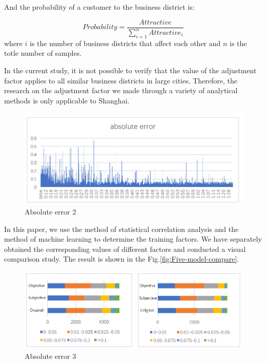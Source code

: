 \documentclass[journal,transmag]{IEEEtran}
\begin{document}
And the probability of a customer to the business district is:

\begin{equation}
Probability=\frac{Attractive}{\sum_{i=1}^{n}Attractive_{i}}
\end{equation}
where $i$ is the number of business districts that affect each other and $n$ is the totle number of samples.

In the current study, it is not possible to verify that the value of the adjustment factor applies to all similar business districts in large cities. Therefore, the research on the adjustment factor we made through a variety of analytical methods is only applicable to Shanghai.

\begin{figure}[tb]
\centering
\includegraphics[width=1\columnwidth]{figure7.png}
\caption{Absolute error 2}
\label{fig:Absolute-error 2}
\end{figure}

In this paper, we use the method of statistical correlation analysis and the method of machine learning to determine the training factors. We have separately obtained the corresponding values of different factors and conducted a visual comparison study. The result is shown in the Fig.\ref{fig:Five-model-compare}.

\begin{figure}[tb]
\centering
\includegraphics[width=1\columnwidth]{figure8.png}
\caption{Absolute error 3}
\label{fig:Absolute-error 3}
\end{figure}
\end{document}
